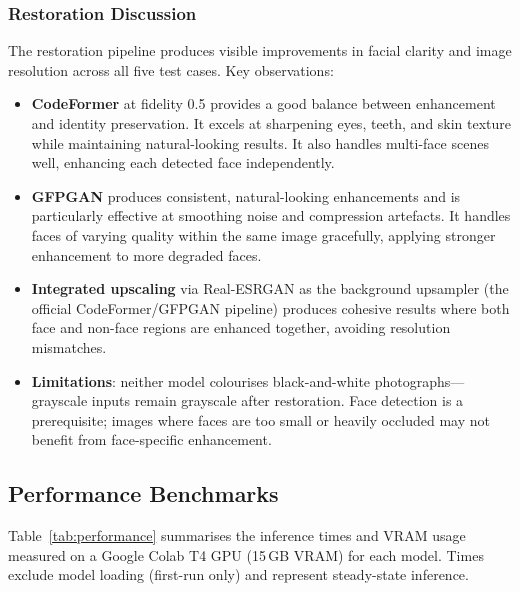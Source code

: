 \documentclass[12pt,a4paper]{report}
\begin{document}
\subsubsection{Restoration Discussion}

The restoration pipeline produces visible improvements in facial clarity and image resolution across all five test cases. Key observations:

\begin{itemize}
    \item \textbf{CodeFormer} at fidelity 0.5 provides a good balance between enhancement and identity preservation. It excels at sharpening eyes, teeth, and skin texture while maintaining natural-looking results. It also handles multi-face scenes well, enhancing each detected face independently.
    \item \textbf{GFPGAN} produces consistent, natural-looking enhancements and is particularly effective at smoothing noise and compression artefacts. It handles faces of varying quality within the same image gracefully, applying stronger enhancement to more degraded faces.
    \item \textbf{Integrated upscaling} via Real-ESRGAN as the background upsampler (the official CodeFormer/GFPGAN pipeline) produces cohesive results where both face and non-face regions are enhanced together, avoiding resolution mismatches.
    \item \textbf{Limitations}: neither model colourises black-and-white photographs---grayscale inputs remain grayscale after restoration. Face detection is a prerequisite; images where faces are too small or heavily occluded may not benefit from face-specific enhancement.
\end{itemize}

\subsection{Performance Benchmarks}

Table~\ref{tab:performance} summarises the inference times and VRAM usage measured on a Google Colab T4 GPU (15\,GB VRAM) for each model. Times exclude model loading (first-run only) and represent steady-state inference.
\end{document}
